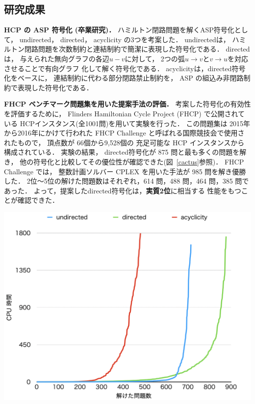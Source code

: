 \documentclass[a4j,10pt]{jarticle}
\begin{document}
\begin{multicols}{1}
\section{研究成果}
\textbf{HCP の ASP 符号化 (卒業研究)．}
ハミルトン閉路問題を解くASP符号化として，
\textsf{undirected}，
\textsf{directed}，
\textsf{acyclicity}
の3つを考案した．
\textsf{undirected}は，
ハミルトン閉路問題を次数制約と連結制約で簡潔に表現した符号化である．
\textsf{directed}は，
与えられた無向グラフの各辺$u-v$に対して，
2つの弧$u\rightarrow v$と$v\rightarrow u$を対応させることで有向グラフ
化して解く符号化である．
\textsf{acyclicity}は，\textsf{directed}符号化をベースに，
連結制約に代わる部分閉路禁止制約を，
ASP の組込み非閉路制約で表現した符号化である．


\textbf{FHCP ベンチマーク問題集を用いた提案手法の評価．}
考案した符号化の有効性を評価するために，
Flinders Hamiltonian Cycle Project (FHCP) で公開されている
HCPインスタンス(全1001問)を用いて実験を行った．
この問題集は 2015年から2016年にかけて行われた 
FHCP Challenge と呼ばれる国際競技会で使用されたもので，
頂点数が 66個から9,528個の 充足可能な HCP インスタンスから構成されている．
実験の結果，
\textsf{directed}符号化が 875 問と最も多くの問題を解き，
他の符号化と比較してその優位性が確認できた(図~\ref{cactus}参照)．
FHCP Challenge では，
整数計画ソルバー CPLEX を用いた手法が 985 問を解き優勝した．
2位〜5位の解けた問題数はそれぞれ，614 問，488 問，464 問，385 問であった．
よって，提案した\textsf{directed}符号化は，\textbf{実質2位}に相当する
性能をもつことが確認できた．

{ \centering
 \includegraphics[width=1.0\linewidth]{cactus.png}\\
 \label{cactus}
}


\end{multicols}
\end{document}
